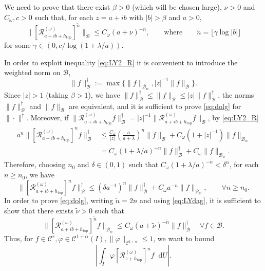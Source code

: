 \documentclass[11pt,letterpaper]{amsart}
\newcommand \cR {{\mathcal R}}
\newcommand \N {{ \mathbb N}}
\newcommand \cB {{\mathscr B}}
\newcommand \cC {{\mathscr{C}}}
\newcommand*{\diff}{\mathop{}\!\mathrm{d}}
\DeclareMathOperator{\topp}{top}
\theoremstyle{definition}
\begin{document}
We need to prove that  there exist $\beta >0$ (which will be chosen large), $\nu >0$ and $C_\omega, c >0$ such that, for each $z=a+ib$ with  $|b|>\beta$ and $a>0$, 
\begin{equation}\label{eq:dolg}
\|[\cR^{(\omega)}_{a+ib+h_{\topp}}]^{\tilde n} \|_{\cB} \le C_\omega (a+\nu)^{-\tilde n}, \qquad \text {where} \qquad \tilde n= \lfloor \gamma \log |b| \rfloor
\end{equation}
for some $\gamma \in (0, c/\log(1+\lambda/a))$.



In order to exploit inequality \eqref{eq:LY2_R} it is convenient to introduce the weighted norm on $\cB$,
\[
\|f\|_{\cB}^{\dagger}:=\max \{\|f\|_{\cB_w}, |z|^{-1}\|f\|_{\cB}\}.
\]
Since $|z|>1$ (taking $\beta>1$), we have $\|f\|_{\cB}^{\dagger}\le \|f\|_{\cB}\le |z|\|f\|^\dagger_{\cB}$, the norms $\|f\|_{\cB}^{\dagger}$ and $\|f\|_{\cB}$ are equivalent, and it is sufficient to prove \eqref{eq:dolg} for $\|\cdot\|^\dagger$. 
Moreover, if $\|\cR^{(\omega)}_{a+ib+h_{\topp}} f \|_{\cB}^\dagger =|z|^{-1}\|\cR^{(\omega)}_{a+ib+h_{\topp}} f\|_{\cB}$,  by \eqref{eq:LY2_R}
\[
\begin{split}
a^n\|[\cR^{(\omega)}_{a+ib+h_{\topp}}]^n f \|_{\cB}^\dagger &\le \frac{C_\omega}{|z|} \left(\frac{a}{a+\lambda}\right)^n \|f\|_{\cB}+ C_\omega (1+|z|^{-1})\|f\|_{\cB_w}\\
&=C_\omega \left({1+\lambda/a}\right)^{-n}  \|f\|_{\cB}^{\dagger}+C_\omega \|f\|_{\cB_w}.
\end{split}
\]
Therefore, choosing $n_0$ and $\delta \in (0,1)$ such that $C_\omega(1+\lambda/a)^{-n}< \delta^n$, for each $n \ge n_0$, we have
\begin{equation}\label{eq:LYdag}
\|[\cR^{(\omega)}_{a+ib+h_{\topp}}]^n f \|_{\cB}^\dagger \le (\delta a^{-1})^{n} \|f \|_{\cB}^\dagger+C_\omega a^{-n}\|f\|_{\cB_w}, \qquad \forall n \ge n_0.
\end{equation}
In order to prove \eqref{eq:dolg}, writing $\tilde n = 2n$ and using \eqref{eq:LYdag}, it is sufficient to show that there exists $\tilde \nu >0$ such that
\begin{equation}\label{eq:wdolg}
\|[\cR^{(\omega)}_{a+ib+h_{\topp}}]^{\tilde n} f \|_{\cB_w} \le C_\omega (a+\tilde \nu)^{-\tilde n} \|f\|^\dagger_{\cB} \quad \forall f \in \cB.
\end{equation}
Thus, for $f\in \cC^r, \varphi \in \cC^{1+\alpha}(I), \|\varphi\|_{\cC^{1+\alpha}}\le 1$, we want to bound
\begin{equation}\label{eq:integral1}
\left| \int_I \varphi[\cR^{(\omega)}_{z+h_{\topp}}]^n f \diff U\right|.
\end{equation}
\end{document}
